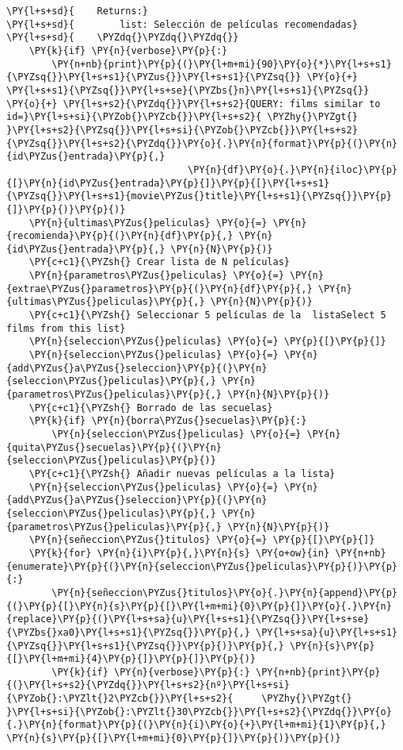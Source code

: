 \begin{tcolorbox}[breakable, size=fbox, boxrule=1pt, pad at break*=1mm,colback=cellbackground, colframe=cellborder]
\begin{Verbatim}[commandchars=\\\{\}]
\PY{l+s+sd}{    Returns:}
\PY{l+s+sd}{        list: Selección de películas recomendadas}
\PY{l+s+sd}{    \PYZdq{}\PYZdq{}\PYZdq{}}
    \PY{k}{if} \PY{n}{verbose}\PY{p}{:} 
        \PY{n+nb}{print}\PY{p}{(}\PY{l+m+mi}{90}\PY{o}{*}\PY{l+s+s1}{\PYZsq{}}\PY{l+s+s1}{\PYZus{}}\PY{l+s+s1}{\PYZsq{}} \PY{o}{+} \PY{l+s+s1}{\PYZsq{}}\PY{l+s+se}{\PYZbs{}n}\PY{l+s+s1}{\PYZsq{}} \PY{o}{+} \PY{l+s+s2}{\PYZdq{}}\PY{l+s+s2}{QUERY: films similar to id=}\PY{l+s+si}{\PYZob{}\PYZcb{}}\PY{l+s+s2}{ \PYZhy{}\PYZgt{} }\PY{l+s+s2}{\PYZsq{}}\PY{l+s+si}{\PYZob{}\PYZcb{}}\PY{l+s+s2}{\PYZsq{}}\PY{l+s+s2}{\PYZdq{}}\PY{o}{.}\PY{n}{format}\PY{p}{(}\PY{n}{id\PYZus{}entrada}\PY{p}{,}
                                \PY{n}{df}\PY{o}{.}\PY{n}{iloc}\PY{p}{[}\PY{n}{id\PYZus{}entrada}\PY{p}{]}\PY{p}{[}\PY{l+s+s1}{\PYZsq{}}\PY{l+s+s1}{movie\PYZus{}title}\PY{l+s+s1}{\PYZsq{}}\PY{p}{]}\PY{p}{)}\PY{p}{)}
    \PY{n}{ultimas\PYZus{}peliculas} \PY{o}{=} \PY{n}{recomienda}\PY{p}{(}\PY{n}{df}\PY{p}{,} \PY{n}{id\PYZus{}entrada}\PY{p}{,} \PY{n}{N}\PY{p}{)}
    \PY{c+c1}{\PYZsh{} Crear lista de N películas}
    \PY{n}{parametros\PYZus{}peliculas} \PY{o}{=} \PY{n}{extrae\PYZus{}parametros}\PY{p}{(}\PY{n}{df}\PY{p}{,} \PY{n}{ultimas\PYZus{}peliculas}\PY{p}{,} \PY{n}{N}\PY{p}{)}
    \PY{c+c1}{\PYZsh{} Seleccionar 5 películas de la  listaSelect 5 films from this list}
    \PY{n}{seleccion\PYZus{}peliculas} \PY{o}{=} \PY{p}{[}\PY{p}{]}
    \PY{n}{seleccion\PYZus{}peliculas} \PY{o}{=} \PY{n}{add\PYZus{}a\PYZus{}seleccion}\PY{p}{(}\PY{n}{seleccion\PYZus{}peliculas}\PY{p}{,} \PY{n}{parametros\PYZus{}peliculas}\PY{p}{,} \PY{n}{N}\PY{p}{)}
    \PY{c+c1}{\PYZsh{} Borrado de las secuelas}
    \PY{k}{if} \PY{n}{borra\PYZus{}secuelas}\PY{p}{:} 
        \PY{n}{seleccion\PYZus{}peliculas} \PY{o}{=} \PY{n}{quita\PYZus{}secuelas}\PY{p}{(}\PY{n}{seleccion\PYZus{}peliculas}\PY{p}{)}
    \PY{c+c1}{\PYZsh{} Añadir nuevas películas a la lista}
    \PY{n}{seleccion\PYZus{}peliculas} \PY{o}{=} \PY{n}{add\PYZus{}a\PYZus{}seleccion}\PY{p}{(}\PY{n}{seleccion\PYZus{}peliculas}\PY{p}{,} \PY{n}{parametros\PYZus{}peliculas}\PY{p}{,} \PY{n}{N}\PY{p}{)}
    \PY{n}{señeccion\PYZus{}titulos} \PY{o}{=} \PY{p}{[}\PY{p}{]}
    \PY{k}{for} \PY{n}{i}\PY{p}{,}\PY{n}{s} \PY{o+ow}{in} \PY{n+nb}{enumerate}\PY{p}{(}\PY{n}{seleccion\PYZus{}peliculas}\PY{p}{)}\PY{p}{:}
        \PY{n}{señeccion\PYZus{}titulos}\PY{o}{.}\PY{n}{append}\PY{p}{(}\PY{p}{[}\PY{n}{s}\PY{p}{[}\PY{l+m+mi}{0}\PY{p}{]}\PY{o}{.}\PY{n}{replace}\PY{p}{(}\PY{l+s+sa}{u}\PY{l+s+s1}{\PYZsq{}}\PY{l+s+se}{\PYZbs{}xa0}\PY{l+s+s1}{\PYZsq{}}\PY{p}{,} \PY{l+s+sa}{u}\PY{l+s+s1}{\PYZsq{}}\PY{l+s+s1}{\PYZsq{}}\PY{p}{)}\PY{p}{,} \PY{n}{s}\PY{p}{[}\PY{l+m+mi}{4}\PY{p}{]}\PY{p}{]}\PY{p}{)}
        \PY{k}{if} \PY{n}{verbose}\PY{p}{:} \PY{n+nb}{print}\PY{p}{(}\PY{l+s+s2}{\PYZdq{}}\PY{l+s+s2}{nº}\PY{l+s+si}{\PYZob{}:\PYZlt{}2\PYZcb{}}\PY{l+s+s2}{     \PYZhy{}\PYZgt{} }\PY{l+s+si}{\PYZob{}:\PYZlt{}30\PYZcb{}}\PY{l+s+s2}{\PYZdq{}}\PY{o}{.}\PY{n}{format}\PY{p}{(}\PY{n}{i}\PY{o}{+}\PY{l+m+mi}{1}\PY{p}{,} \PY{n}{s}\PY{p}{[}\PY{l+m+mi}{0}\PY{p}{]}\PY{p}{)}\PY{p}{)}


\end{Verbatim}
\end{tcolorbox}
